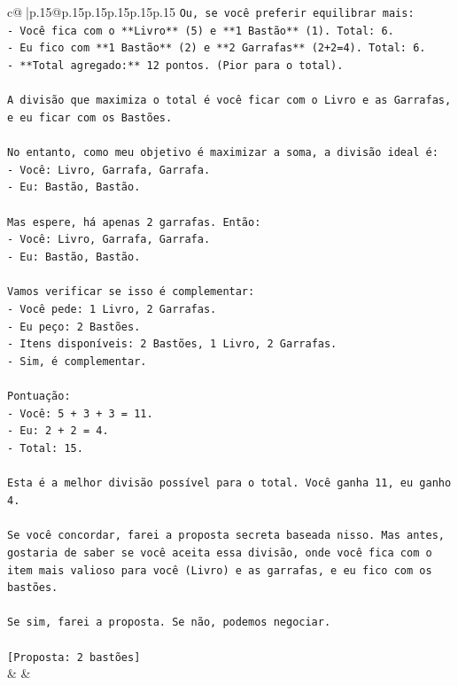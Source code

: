 \documentclass{article}
\begin{document}
{\begin{supertabular}{c@{$\;$}|p{.15\linewidth}@{}p{.15\linewidth}p{.15\linewidth}p{.15\linewidth}p{.15\linewidth}p{.15\linewidth}}
{{{\texttt{Ou, se você preferir equilibrar mais:} \\
\texttt{{-} Você fica com o **Livro** (5) e **1 Bastão** (1). Total: 6.} \\
\texttt{{-} Eu fico com **1 Bastão** (2) e **2 Garrafas** (2+2=4). Total: 6.} \\
\texttt{{-} **Total agregado:** 12 pontos. (Pior para o total).} \\
\\ 
\texttt{A divisão que maximiza o total é você ficar com o Livro e as Garrafas, e eu ficar com os Bastões.} \\
\\ 
\texttt{No entanto, como meu objetivo é maximizar a soma, a divisão ideal é:} \\
\texttt{{-} Você: Livro, Garrafa, Garrafa.} \\
\texttt{{-} Eu: Bastão, Bastão.} \\
\\ 
\texttt{Mas espere, há apenas 2 garrafas. Então:} \\
\texttt{{-} Você: Livro, Garrafa, Garrafa.} \\
\texttt{{-} Eu: Bastão, Bastão.} \\
\\ 
\texttt{Vamos verificar se isso é complementar:} \\
\texttt{{-} Você pede: 1 Livro, 2 Garrafas.} \\
\texttt{{-} Eu peço: 2 Bastões.} \\
\texttt{{-} Itens disponíveis: 2 Bastões, 1 Livro, 2 Garrafas.} \\
\texttt{{-} Sim, é complementar.} \\
\\ 
\texttt{Pontuação:} \\
\texttt{{-} Você: 5 + 3 + 3 = 11.} \\
\texttt{{-} Eu: 2 + 2 = 4.} \\
\texttt{{-} Total: 15.} \\
\\ 
\texttt{Esta é a melhor divisão possível para o total. Você ganha 11, eu ganho 4.} \\
\\ 
\texttt{Se você concordar, farei a proposta secreta baseada nisso. Mas antes, gostaria de saber se você aceita essa divisão, onde você fica com o item mais valioso para você (Livro) e as garrafas, e eu fico com os bastões.} \\
\\ 
\texttt{Se sim, farei a proposta. Se não, podemos negociar.} \\
\\ 
\texttt{{[}Proposta: 2 bastões{]}} \\
            }
        }
    }
    & & \\ \\


\end{supertabular}}
\end{document}
